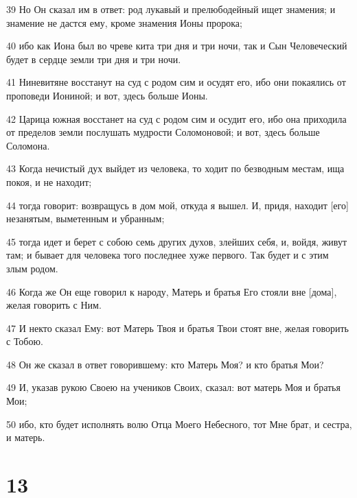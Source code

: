 \par 39 Но Он сказал им в ответ: род лукавый и прелюбодейный ищет знамения; и знамение не дастся ему, кроме знамения Ионы пророка;
\par 40 ибо как Иона был во чреве кита три дня и три ночи, так и Сын Человеческий будет в сердце земли три дня и три ночи.
\par 41 Ниневитяне восстанут на суд с родом сим и осудят его, ибо они покаялись от проповеди Иониной; и вот, здесь больше Ионы.
\par 42 Царица южная восстанет на суд с родом сим и осудит его, ибо она приходила от пределов земли послушать мудрости Соломоновой; и вот, здесь больше Соломона.
\par 43 Когда нечистый дух выйдет из человека, то ходит по безводным местам, ища покоя, и не находит;
\par 44 тогда говорит: возвращусь в дом мой, откуда я вышел. И, придя, находит [его] незанятым, выметенным и убранным;
\par 45 тогда идет и берет с собою семь других духов, злейших себя, и, войдя, живут там; и бывает для человека того последнее хуже первого. Так будет и с этим злым родом.
\par 46 Когда же Он еще говорил к народу, Матерь и братья Его стояли вне [дома], желая говорить с Ним.
\par 47 И некто сказал Ему: вот Матерь Твоя и братья Твои стоят вне, желая говорить с Тобою.
\par 48 Он же сказал в ответ говорившему: кто Матерь Моя? и кто братья Мои?
\par 49 И, указав рукою Своею на учеников Своих, сказал: вот матерь Моя и братья Мои;
\par 50 ибо, кто будет исполнять волю Отца Моего Небесного, тот Мне брат, и сестра, и матерь.

\chapter{13}

